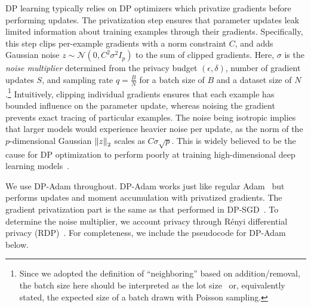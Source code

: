 DP learning typically relies on DP optimizers which privatize gradients before performing updates. 
The privatization step ensures that parameter updates leak limited information about training examples through their gradients.
Specifically, this step clips per-example gradients with a norm constraint $C$, and adds Gaussian noise $z\sim\mathcal{N}(0, C^2\sigma^2 I_p)$ to the sum of clipped gradients.
Here, $\sigma$ is the \textit{noise multiplier} determined from the privacy budget $(\epsilon, \delta)$, number of gradient updates $S$, and sampling rate $q=\tfrac{B}{N}$ for a batch size of $B$ and a dataset size of $N$.\footnote{Since we adopted the definition of ``neighboring'' based on addition/removal, the batch size here should be interpreted as the lot size~\citep{abadi2016deep} or, equivalently stated, the expected size of a batch drawn with Poisson sampling.}
Intuitively, clipping individual gradients ensures that each example has bounded influence on the parameter update, whereas noising the gradient prevents exact tracing of particular examples.
The noise being isotropic implies that larger models would experience heavier noise per update, as the norm of the $p$-dimensional Gaussian $\left\lVert z\right\rVert_2$ scales as $C \sigma \sqrt{p}$.
This is widely believed to be the cause for DP optimization to perform poorly at training high-dimensional deep learning models~\citep{gautum14,yu2021not}.

We use DP-Adam throughout. DP-Adam works just like regular Adam~\citep{kingma2014adam} but performs updates and moment accumulation with privatized gradients. 
The gradient privatization part is the same as that performed in DP-SGD~\citep{song2013stochastic,abadi2016deep}.
To determine the noise multiplier, we account privacy through R\'enyi differential privacy (RDP)~\citep{mironov2017renyi,mironov2019r}.
For completeness, we include the pseudocode for DP-Adam below. 

